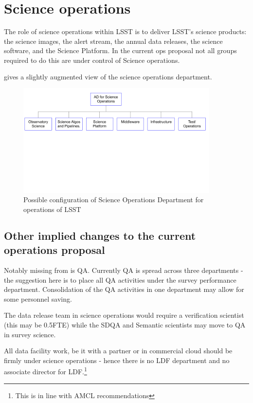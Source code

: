 
\section{Science operations}\label{sec:sciops}

The role of science operations within LSST is to deliver LSST's science products: the science images, the alert stream, the annual data releases, the science software, and the Science Platform. In the current ops proposal not all groups required to do this are under control of Science operations.

 gives a slightly augmented view of the science operations department.

\begin{figure}
\includegraphics[width=0.9\textwidth]{figures/OrgOpsChart}
\caption{Possible configuration of Science Operations Department for operations of LSST \label{fig:org}}
\end{figure}


\subsection{Other implied changes to the current operations proposal}
Notably missing from  is QA. Currently QA is spread across  three
 departments - the suggestion here is to place all QA activities under the survey performance department. Consolidation
of the QA activities in one department may allow for some personnel saving.

The data release team in science operations would require a verification scientist (this may be 0.5FTE) while the SDQA and Semantic scientists may move to QA in survey science.

All data facility work, be it with a partner or in commercial cloud should be firmly under science operations - hence there is no LDF department and no associate director for LDF.\footnote{This is  in line with AMCL recommendations}


